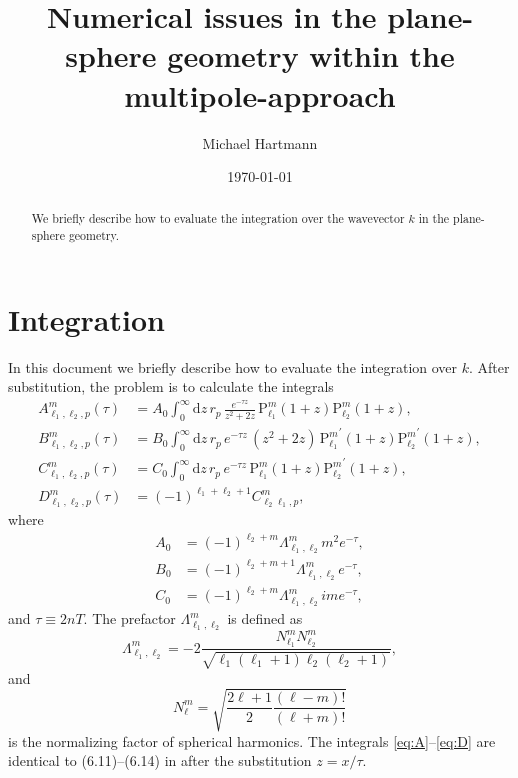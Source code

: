 \documentclass[superscriptaddress,prb]{revtex4-1}
\newcommand{\imag}{i} %
\newcommand{\e}{e}    %
\newcommand{\Plm}[2]{{\text{P}_{#1}^{#2}}}
\begin{document}
\title{Numerical issues in the plane-sphere geometry within the multipole-approach}

\author{Michael Hartmann}

\date{\today}

\begin{abstract}
We briefly describe how to evaluate the integration over the wavevector $k$ in the plane-sphere geometry.
\end{abstract}

\maketitle
\section{Integration}

In this document we briefly describe how to evaluate the integration over $k$.
After substitution, the problem is to calculate the integrals
\begin{align}
\label{eq:A}
A_{\ell_1,\ell_2,p}^{m}(\tau) &= A_0 \int_0^\infty \mathrm{d}z \, r_p \, \frac{\e^{-\tau z}}{z^2+2z} \, \Plm{\ell_1}{m}(1+z) \Plm{\ell_2}{m}(1+z), \\
\label{eq:B}
B_{\ell_1,\ell_2,p}^{m}(\tau) &= B_0 \int_0^\infty \mathrm{d}z \, r_p \, \e^{-\tau z} \, (z^2+2z) \, \Plm{\ell_1}{m}^\prime(1+z) \Plm{\ell_2}{m}^\prime(1+z), \\
\label{eq:C}
C_{\ell_1,\ell_2,p}^{m}(\tau) &= C_0 \int_0^\infty \mathrm{d}z \, r_p \, \e^{-\tau z} \, \Plm{\ell_1}{m}(1+z) \Plm{\ell_2}{m}^\prime(1+z), \\
\label{eq:D}
D_{\ell_1,\ell_2,p}^{m}(\tau) &= (-1)^{\ell_1+\ell_2+1} C_{\ell_2\ell_1,p}^{m},
\end{align}
where
\begin{align}
A_0 &= (-1)^{\ell_2+m} \Lambda_{\ell_1,\ell_2}^m m^2 \e^{-\tau}, \\
B_0 &= (-1)^{\ell_2+m+1} \Lambda_{\ell_1,\ell_2}^m \e^{-\tau}, \\
C_0 &= (-1)^{\ell_2+m} \Lambda_{\ell_1,\ell_2}^m \imag m \e^{-\tau},
\end{align}
and $\tau \equiv 2nT$. The prefactor $\Lambda_{\ell_1,\ell_2}^m$ is defined as
\begin{equation}
\Lambda_{\ell_1,\ell_2}^m = -2 \frac{N_{\ell_1}^m N_{\ell_2}^m}{\sqrt{\ell_1 (\ell_1+1) \ell_2 (\ell_2+1)}},
\end{equation}
and
\begin{equation}
N_\ell^m = \sqrt{\frac{2\ell+1}{2} \frac{(\ell-m)!}{(\ell+m)!}}
\end{equation}
is the normalizing factor of spherical harmonics.
The integrals \eqref{eq:A}--\eqref{eq:D} are identical to (6.11)--(6.14) in
\cite{hartmann} after the substitution $z = x/\tau$.
\end{document}
